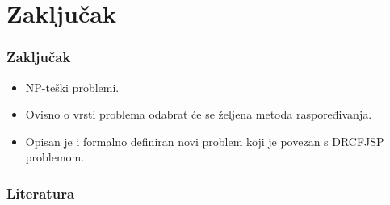 \documentclass{beamer}
\begin{document}
\section{Zaključak}
\begin{frame}
\frametitle{Zaključak}
\begin{itemize}
    \item NP-teški problemi.
    \item Ovisno o vrsti problema odabrat će se željena metoda raspoređivanja.
    \item Opisan je i formalno definiran novi problem koji je povezan s DRCFJSP problemom.
\end{itemize}
\end{frame}

\begin{frame}
\frametitle{Literatura}


\end{frame}
\end{document}
